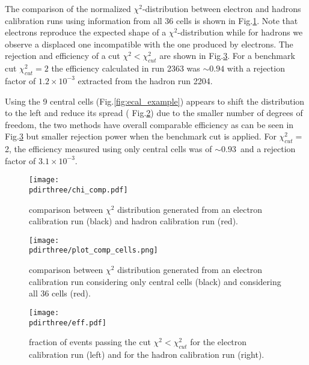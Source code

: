The comparison of the normalized $\chi^2$-distribution between
electron and hadrons calibration runs using information from all 36
cells is shown in Fig.\ref{fig:chi2}. Note that electrons reproduce
the expected shape of a $\chi^2$-distribution while for hadrons we
observe a displaced one incompatible with the one produced by
electrons.  The rejection and efficiency of a cut
$\chi^2 < \chi^2_{cut}$ are shown in Fig.\ref{fig:eff}. For
a benchmark cut $\chi^2_{cut} = 2$ the efficiency calculated in run 2363
was $\sim 0.94$ with a rejection factor of $1.2\times 10^{-3}$
extracted from the hadron run 2204.

Using the 9 central cells (Fig.\ref{fig:ecal_example}) appears to shift the distribution
to the left and reduce its spread ( Fig.\ref{fig:chi}) due to the
smaller number of degrees of freedom, the two methods have overall
comparable efficiency as can be seen in Fig.\ref{fig:eff} but smaller
rejection power when the benchmark cut is applied.  For $\chi^2_{cut}=$2, the efficiency measured using only
central cells was of $\sim 0.93$\ and a rejection factor of $3.1\times 10^{-3}$.


\begin{figure}[h!]
  \begin{center}
    \texttt{[image: \\pdirthree/chi\_comp.pdf]}
  \end{center}
  \caption[comparison between $\chi^2$ distribution, electron and hadron calibration run]{comparison between $\chi^2$ distribution generated from an electron calibration run (black) and hadron calibration run (red).}
  \label{fig:chi2}
\end{figure}

\begin{figure}[h!]
  \begin{center}
    \texttt{[image: \\pdirthree/plot\_comp\_cells.png]}
  \end{center}
  \caption[comparison between $\chi^2$ distribution for different ECAL configurations]{comparison between $\chi^2$ distribution generated from an electron calibration run considering only central cells (black) and considering all 36 cells (red).}
  \label{fig:chi}
\end{figure}

\begin{figure}[h!]
  \begin{center}
    \texttt{[image: \\pdirthree/eff.pdf]}
  \end{center}
  \caption[fraction of events passing the $\chi^2$ cut]{fraction of events passing the cut $\chi^2 < \chi^2_{cut}$
    for the electron calibration run (left) and for the hadron calibration run (right).}
  \label{fig:eff}
\end{figure}

